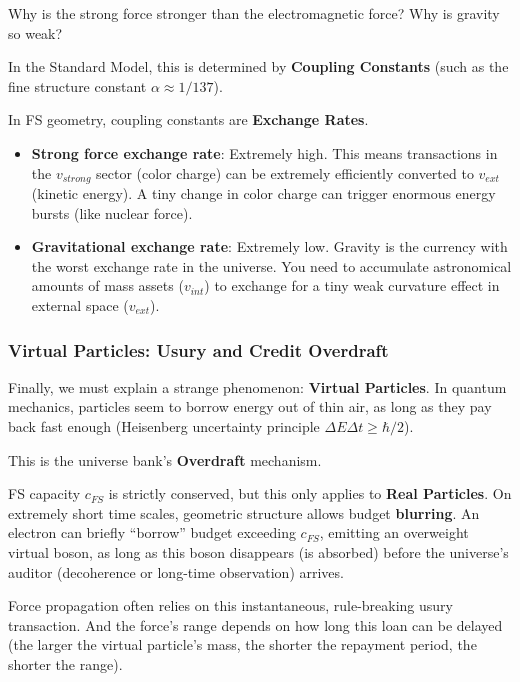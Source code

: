 Why is the strong force stronger than the electromagnetic force? Why is gravity so weak?

In the Standard Model, this is determined by \textbf{Coupling Constants} (such as the fine structure constant $\alpha \approx 1/137$).

In FS geometry, coupling constants are \textbf{Exchange Rates}.

\begin{itemize}
\item \textbf{Strong force exchange rate}: Extremely high. This means transactions in the $v_{strong}$ sector (color charge) can be extremely efficiently converted to $v_{ext}$ (kinetic energy). A tiny change in color charge can trigger enormous energy bursts (like nuclear force).

\item \textbf{Gravitational exchange rate}: Extremely low. Gravity is the currency with the worst exchange rate in the universe. You need to accumulate astronomical amounts of mass assets ($v_{int}$) to exchange for a tiny weak curvature effect in external space ($v_{ext}$).
\end{itemize}

\subsubsection{Virtual Particles: Usury and Credit Overdraft}

Finally, we must explain a strange phenomenon: \textbf{Virtual Particles}. In quantum mechanics, particles seem to borrow energy out of thin air, as long as they pay back fast enough (Heisenberg uncertainty principle $\Delta E \Delta t \ge \hbar/2$).

This is the universe bank's \textbf{Overdraft} mechanism.

FS capacity $c_{FS}$ is strictly conserved, but this only applies to \textbf{Real Particles}. On extremely short time scales, geometric structure allows budget \textbf{blurring}. An electron can briefly ``borrow'' budget exceeding $c_{FS}$, emitting an overweight virtual boson, as long as this boson disappears (is absorbed) before the universe's auditor (decoherence or long-time observation) arrives.

Force propagation often relies on this instantaneous, rule-breaking usury transaction. And the force's range depends on how long this loan can be delayed (the larger the virtual particle's mass, the shorter the repayment period, the shorter the range).

